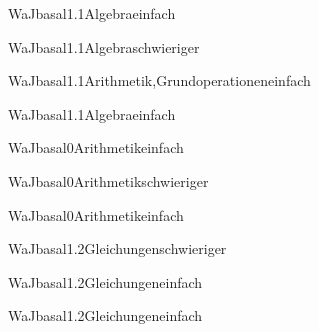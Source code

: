 \documentclass[12pt]{article}
\begin{document}
\begin{Add}{WaJ}{basal1.1}{Algebra}{einfach}
\end{Add}

\begin{Add}{WaJ}{basal1.1}{Algebra}{schwieriger}
\end{Add}

\begin{Add}{WaJ}{basal1.1}{Arithmetik,Grundoperationen}{einfach}
\end{Add}

\begin{Add}{WaJ}{basal1.1}{Algebra}{einfach}
\end{Add}

\begin{Add}{WaJ}{basal0}{Arithmetik}{einfach}
\end{Add}

\begin{Add}{WaJ}{basal0}{Arithmetik}{schwieriger}
\end{Add}

\begin{Add}{WaJ}{basal0}{Arithmetik}{einfach}
\end{Add}

\begin{Add}{WaJ}{basal1.2}{Gleichungen}{schwieriger}
\end{Add}

\begin{Add}{WaJ}{basal1.2}{Gleichungen}{einfach}
\end{Add}

\begin{Add}{WaJ}{basal1.2}{Gleichungen}{einfach}
\end{Add}
\end{document}
